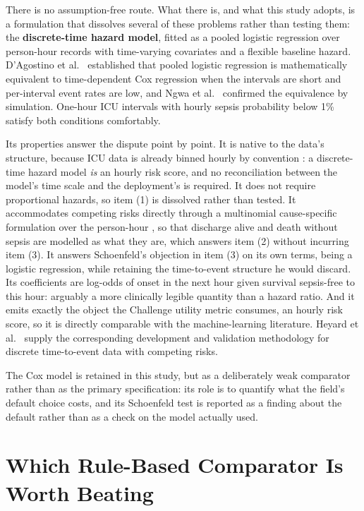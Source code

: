 There is no assumption-free route. What there is, and what this study adopts,
is a formulation that dissolves several of these problems rather than testing
them: the \textbf{discrete-time hazard model}, fitted as a pooled logistic
regression over person-hour records with time-varying covariates and a flexible
baseline hazard. D'Agostino et al.\ \cite{dagostino1990pooled} established that
pooled logistic regression is mathematically equivalent to time-dependent Cox
regression when the intervals are short and per-interval event rates are low,
and Ngwa et al.\ \cite{ngwa2016comparison} confirmed the equivalence by
simulation. One-hour ICU intervals with hourly sepsis probability below 1\%
satisfy both conditions comfortably.

Its properties answer the dispute point by point. It is native to the data's
structure, because ICU data is already binned hourly by convention
\cite{reyna2020utility, nemati2018aise}: a discrete-time hazard model
\emph{is} an hourly risk score, and no reconciliation between the model's time
scale and the deployment's is required. It does not require proportional
hazards, so item (1) is dissolved rather than tested. It accommodates competing
risks directly through a multinomial cause-specific formulation over the
person-hour \cite{rescherigon2006competing, heyard2019dynamic}, so that
discharge alive and death without sepsis are modelled as what they are, which
answers item (2) without incurring item (3). It answers Schoenfeld's objection
in item (3) on its own terms, being a logistic regression, while retaining the
time-to-event structure he would discard. Its coefficients are log-odds of
onset in the next hour given survival sepsis-free to this hour: arguably a
more clinically legible quantity than a hazard ratio. And it emits exactly the
object the Challenge utility metric consumes, an hourly risk score, so it is
directly comparable with the machine-learning literature. Heyard et al.\
\cite{heyard2019dynamic, heyard2020evaluation} supply the corresponding
development and validation methodology for discrete time-to-event data with
competing risks.

The Cox model is retained in this study, but as a deliberately weak comparator
rather than as the primary specification: its role is to quantify what the
field's default choice costs, and its Schoenfeld test is reported as a finding
about the default rather than as a check on the model actually used.


\section{Which Rule-Based Comparator Is Worth Beating}
\label{sec:comparator_choice}

